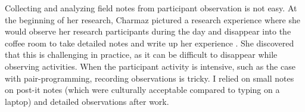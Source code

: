 

Collecting and analyzing field notes from participant observation is not easy. At the beginning of her research, Charmaz pictured a research experience where she would observe her research participants during the day and disappear into the coffee room to take detailed notes and write up her experience \cite{Charmaz}. She discovered that this is challenging in practice, as it can be difficult to disappear while observing activities. When the participant activity is intensive, such as the case with pair-programming, recording observations is tricky. I relied on small notes on post-it notes (which were culturally acceptable compared to typing on a laptop) and detailed observations after work.

